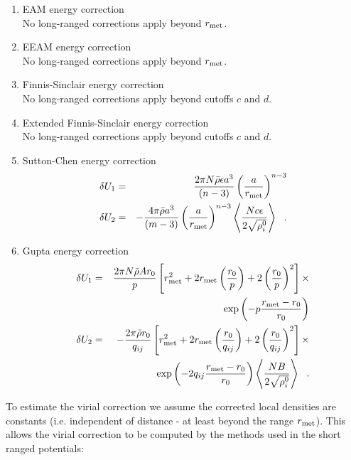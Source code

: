 \begin{enumerate}
\item EAM energy correction \\
No long-ranged corrections apply beyond $r_{\rm met}$.
\item EEAM energy correction \\
No long-ranged corrections apply beyond $r_{\rm met}$.
\item Finnis-Sinclair energy correction \\
No long-ranged corrections apply beyond cutoffs $c$ and $d$.
\item Extended Finnis-Sinclair energy correction \\
No long-ranged corrections apply beyond cutoffs $c$ and $d$.
\item Sutton-Chen energy correction
\begin{eqnarray}
\delta U_{1} &=& \frac{2 \pi N \bar{\rho} \epsilon a^{3}}{(n-3)}
\left( \frac{a}{r_{\rm met}} \right)^{n-3} \nonumber \\
\delta U_{2} &=& -\frac{4 \pi \bar{\rho} a^{3}}{(m-3)} \left( \frac{a}{r_{\rm met}} \right)^{n-3}
\left< \frac{N c \epsilon}{2\sqrt{\rho_{i}^{0}}} \right>~~.
\end{eqnarray}
\item Gupta energy correction
\begin{eqnarray}
\delta U_{1} &=& \frac{2 \pi N \bar{\rho} A r_{0}}{p}
\left[ r_{\rm met}^{2} + 2 r_{\rm met} \left(\frac{r_{0}}{p}\right) +
2 \left(\frac{r_{0}}{p}\right)^{2} \right] \times \nonumber \\
& & \exp \left( -p \frac{r_{\rm met}-r_{0}}{r_{0}}\right) \nonumber \\
\delta U_{2} &=& -\frac{2 \pi \bar{\rho} r_{0}}{q_{ij}}
\left[ r_{\rm met}^{2} + 2 r_{\rm met} \left(\frac{r_{0}}{q_{ij}}\right) +
2 \left(\frac{r_{0}}{q_{ij}}\right)^{2} \right] \times \\
& & \exp \left( -2 q_{ij} \frac{r_{\rm met}-r_{0}}{r_{0}}\right)
\left< \frac{N B}{2\sqrt{\rho_{i}^{0}}} \right>~~. \nonumber
\end{eqnarray}
\end{enumerate}
To estimate the virial correction we assume the corrected local
densities are constants (i.e. independent of distance - at least
beyond the range $r_{\rm met}$).  This allows the virial correction to
be computed by the methods used in the short ranged potentials:
